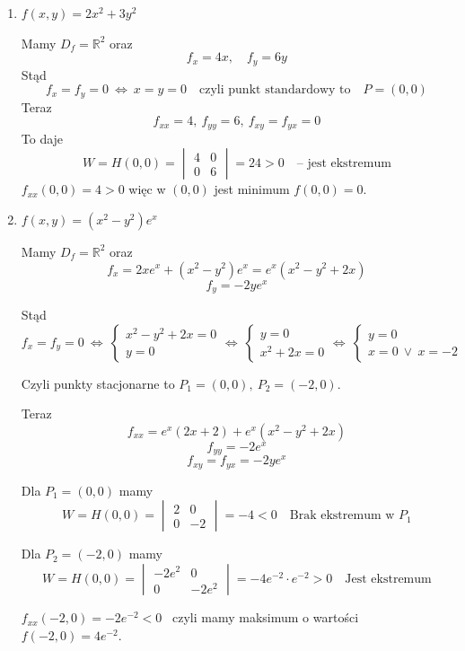 \begin{enumerate}
    \item $ f(x,y) = 2x^2 + 3y^2 $
    
    Mamy $ D_f = \mathbb{R}^2 $ oraz
    $$ f_x = 4x, \quad f_y = 6y $$
    Stąd
    $$ f_x = f_y = 0 \ \Leftrightarrow \ x = y = 0 \quad \textrm{czyli punkt standardowy to} \quad P = (0,0) $$
    Teraz
    $$ f_{xx} = 4, \ f_{yy} = 6, \ f_{xy} = f_{yx} = 0 $$
    To daje
    $$ W = H(0,0) = \begin{vmatrix} 4 & 0 \\ 0 & 6 \end{vmatrix} = 24 > 0 \quad \textrm{-- jest ekstremum} $$
    $ f_{xx}(0,0) = 4 > 0 $ więc w $(0,0)$ jest minimum $ f(0,0) = 0 $. 
    \bigskip
    \item $ f(x,y) = (x^2 - y^2)e^x $
    
    Mamy $ D_f = \mathbb{R}^2 $ oraz
    $$ f_x = 2xe^x + (x^2 - y^2)e^x = e^x(x^2 - y^2 + 2x) $$
    $$ f_y = -2ye^x $$

    Stąd
    $$ f_x = f_y = 0 \ \Leftrightarrow \ \begin{cases} x^2 - y^2 + 2x = 0 \\ y = 0 \end{cases} \Leftrightarrow \
    \begin{cases} y = 0 \\ x^2 + 2x = 0 \end{cases} \Leftrightarrow \ \begin{cases} y = 0 \\ x = 0 \ \lor \ x=-2 \end{cases} $$

    Czyli punkty stacjonarne to $ P_1 = (0,0), \ P_2 = (-2, 0) $.

    Teraz
    $$ f_{xx} = e^x(2x + 2) + e^x(x^2 - y^2 + 2x) $$
    $$ f_{yy} = -2e^x $$
    $$ f_{xy} = f_{yx} = -2ye^x $$

    Dla $ P_1 = (0,0) $ mamy
    $$ W = H(0,0) = \begin{vmatrix} 2 & 0 \\ 0 & -2 \end{vmatrix} = -4 < 0 \quad \textrm{Brak ekstremum w } P_1 $$

    Dla $ P_2 = (-2, 0) $ mamy
    $$ W = H(0,0) = \begin{vmatrix} -2e^2 & 0 \\ 0 & -2e^2 \end{vmatrix} = -4e^{-2} \cdot e^{-2} > 0 \quad \textrm{Jest ekstremum} $$

    $ f_{xx}(-2, 0) = -2e^{-2} < 0 $ \ czyli mamy maksimum o wartości \ $ f(-2, 0) = 4e^{-2} $.
\end{enumerate}


